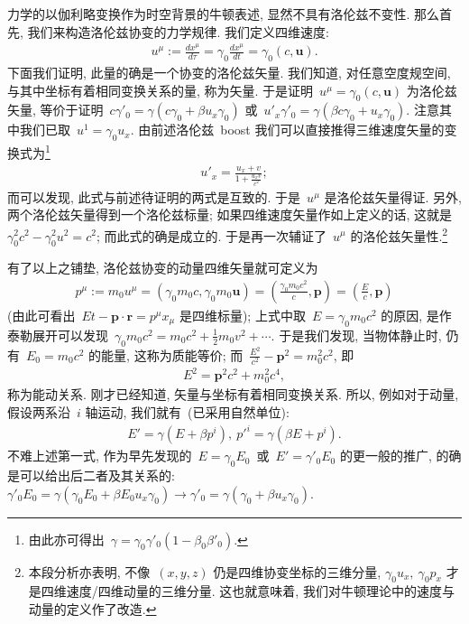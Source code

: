 力学的以伽利略变换作为时空背景的牛顿表述, 显然不具有洛伦兹不变性. 那么首先, 我们来构造洛伦兹协变的力学规律. 我们定义四维速度:
\begin{align}
u^\mu:=\frac{dx^\mu}{d\tau}=\gamma_0\frac{dx^\mu}{dt}=\gamma_0(c,\bm{u}).
\end{align}
下面我们证明, 此量的确是一个协变的洛伦兹矢量. 我们知道, 对任意空度规空间, 与其中坐标有着相同变换关系的量, 称为矢量. 于是证明~$u^\mu=\gamma_0(c,\bm{u})$ 为洛伦兹矢量, 等价于证明~$c\gamma'_0=\gamma(c\gamma_0+\beta u_x\gamma_0)$ 或~$u'_x\gamma'_0=\gamma(\beta c\gamma_0+u_x\gamma_0)$. 注意其中我们已取~$u^1=\gamma_0 u_x$. 由前述洛伦兹~boost 我们可以直接推得三维速度矢量的变换式为\footnote{由此亦可得出~$\gamma=\gamma_0\gamma'_0(1-\beta_0\beta'_0)$.}
\begin{align}
u'_x=\frac{u_x+v}{1+\frac{u_x v}{c^2}};
\end{align}
而可以发现, 此式与前述待证明的两式是互致的. 于是~$u^\mu$ 是洛伦兹矢量得证. 另外, 两个洛伦兹矢量得到一个洛伦兹标量; 如果四维速度矢量作如上定义的话, 这就是~$\gamma_0^2c^2-\gamma_0^2u^2=c^2$; 而此式的确是成立的. 于是再一次辅证了~$u^\mu$  的洛伦兹矢量性.\footnote{本段分析亦表明, 不像~$(x,y,z)$ 仍是四维协变坐标的三维分量, $\gamma_0 u_x,~\gamma_0 p_x$ 才是四维速度/四维动量的三维分量. 这也就意味着, 我们对牛顿理论中的速度与动量的定义作了改造.%
}


有了以上之铺垫, 洛伦兹协变的动量四维矢量就可定义为
\begin{align}
p^\mu:=m_0u^\mu=(\gamma_0 m_0c,\gamma_0 m_0\bm{u})=(\frac{\gamma_0 m_0c^2}{c},\bm{p})=(\frac{E}{c},\bm{p})
\end{align}
(由此可看出~$Et-\bm{p}\cdot\bm{r}=p^\mu x_\mu$ 是四维标量); 上式中取~$E=\gamma_0 m_0c^2$ 的原因, 是作泰勒展开可以发现~$\gamma_0 m_0c^2=m_0c^2+\frac{1}{2}m_0v^2+\cdots$. 于是我们发现, 当物体静止时, 仍有~$E_0=m_0c^2$ 的能量, 这称为质能等价; 而~$\frac{E^2}{c^2}-\bm{p}^2=m_0^2c^2$, 即
\begin{align}
E^2=\bm{p}^2c^2+m_0^2c^4,
\end{align}
称为能动关系. 刚才已经知道, 矢量与坐标有着相同变换关系. 所以, 例如对于动量, 假设两系沿~$i$ 轴运动, 我们就有~(已采用自然单位):
\begin{gather}\label{titi}
E'=\gamma(E+\beta p^i),~p'^i=\gamma(\beta E+p^i).
\end{gather}
不难上述第一式, 作为早先发现的~$E=\gamma_0E_0$~或~$E'=\gamma'_0E_0$ 的更一般的推广, 的确是可以给出后二者及其关系的: $\gamma'_0E_0=\gamma(\gamma_0E_0+\beta E_0u_x\gamma_0)\rightarrow\gamma'_0=\gamma(\gamma_0+\beta u_x\gamma_0)$.

